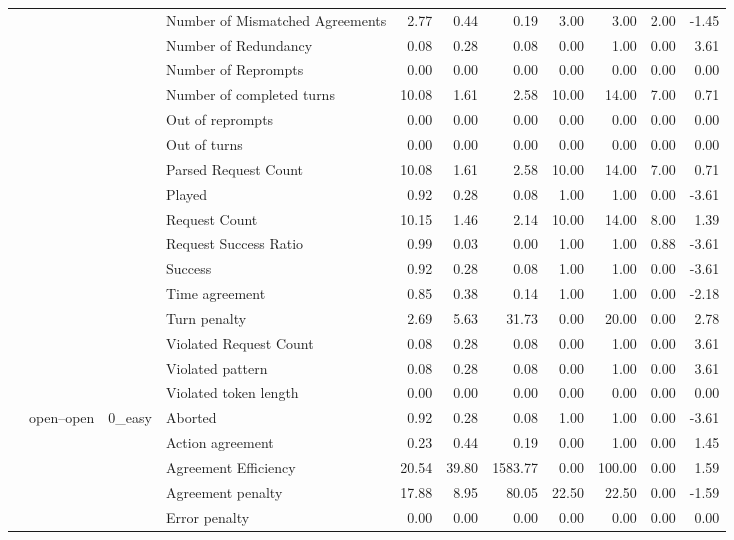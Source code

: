 \begin{tabular}{llllrrrrrrr}
 &  &  & Number of Mismatched Agreements & 2.77 & 0.44 & 0.19 & 3.00 & 3.00 & 2.00 & -1.45 \\
 &  &  & Number of Redundancy & 0.08 & 0.28 & 0.08 & 0.00 & 1.00 & 0.00 & 3.61 \\
 &  &  & Number of Reprompts & 0.00 & 0.00 & 0.00 & 0.00 & 0.00 & 0.00 & 0.00 \\
 &  &  & Number of completed turns & 10.08 & 1.61 & 2.58 & 10.00 & 14.00 & 7.00 & 0.71 \\
 &  &  & Out of reprompts & 0.00 & 0.00 & 0.00 & 0.00 & 0.00 & 0.00 & 0.00 \\
 &  &  & Out of turns & 0.00 & 0.00 & 0.00 & 0.00 & 0.00 & 0.00 & 0.00 \\
 &  &  & Parsed Request Count & 10.08 & 1.61 & 2.58 & 10.00 & 14.00 & 7.00 & 0.71 \\
 &  &  & Played & 0.92 & 0.28 & 0.08 & 1.00 & 1.00 & 0.00 & -3.61 \\
 &  &  & Request Count & 10.15 & 1.46 & 2.14 & 10.00 & 14.00 & 8.00 & 1.39 \\
 &  &  & Request Success Ratio & 0.99 & 0.03 & 0.00 & 1.00 & 1.00 & 0.88 & -3.61 \\
 &  &  & Success & 0.92 & 0.28 & 0.08 & 1.00 & 1.00 & 0.00 & -3.61 \\
 &  &  & Time agreement & 0.85 & 0.38 & 0.14 & 1.00 & 1.00 & 0.00 & -2.18 \\
 &  &  & Turn penalty & 2.69 & 5.63 & 31.73 & 0.00 & 20.00 & 0.00 & 2.78 \\
 &  &  & Violated Request Count & 0.08 & 0.28 & 0.08 & 0.00 & 1.00 & 0.00 & 3.61 \\
 &  &  & Violated pattern & 0.08 & 0.28 & 0.08 & 0.00 & 1.00 & 0.00 & 3.61 \\
 &  &  & Violated token length & 0.00 & 0.00 & 0.00 & 0.00 & 0.00 & 0.00 & 0.00 \\
\cline{2-11} \cline{3-11}
 & \multirow[t]{378}{*}{open--open} & \multirow[t]{27}{*}{0_easy} & Aborted & 0.92 & 0.28 & 0.08 & 1.00 & 1.00 & 0.00 & -3.61 \\
 &  &  & Action agreement & 0.23 & 0.44 & 0.19 & 0.00 & 1.00 & 0.00 & 1.45 \\
 &  &  & Agreement Efficiency & 20.54 & 39.80 & 1583.77 & 0.00 & 100.00 & 0.00 & 1.59 \\
 &  &  & Agreement penalty & 17.88 & 8.95 & 80.05 & 22.50 & 22.50 & 0.00 & -1.59 \\
 &  &  & Error penalty & 0.00 & 0.00 & 0.00 & 0.00 & 0.00 & 0.00 & 0.00 \\

\end{tabular}
